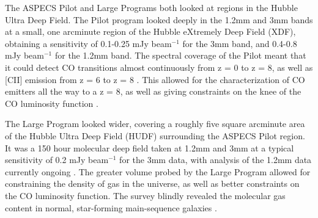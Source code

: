 \documentclass[twoside,single]{lion-msc}
\begin{document}
The ASPECS Pilot and Large Programs both looked at regions in the Hubble Ultra Deep Field. The Pilot program looked deeply in the 1.2mm and 3mm bands at a small, one arcminute region of the Hubble eXtremely Deep Field (XDF), obtaining a sensitivity of 0.1-0.25 mJy beam$^{-1}$ for the 3mm band, and 0.4-0.8 mJy beam$^{-1}$ for the 1.2mm band. The spectral coverage of the Pilot meant that it could detect CO transitions almost continuously from z = 0 to z = 8, as well as [CII] emission from z = 6 to z = 8 \cite{walter2016alma}. This allowed for the characterization of CO emitters all the way to a z = 8, as well as giving constraints on the knee of the CO luminosity function \cite{walter2016alma}. 

The Large Program looked wider, covering a roughly five square arcminute area of the Hubble Ultra Deep Field (HUDF) surrounding the ASPECS Pilot region. It was a 150 hour molecular deep field taken at 1.2mm and 3mm at a typical sensitivity of 0.2 mJy beam$^{-1}$ for the 3mm data, with analysis of the 1.2mm data currently ongoing \cite{decarli2019alma}. The greater volume probed by the Large Program allowed for constraining the density of gas in the universe, as well as better constraints on the CO luminosity function. The survey blindly revealed the molecular gas content in normal, star-forming main-sequence galaxies \cite{decarli2019alma}. 



\end{document}
